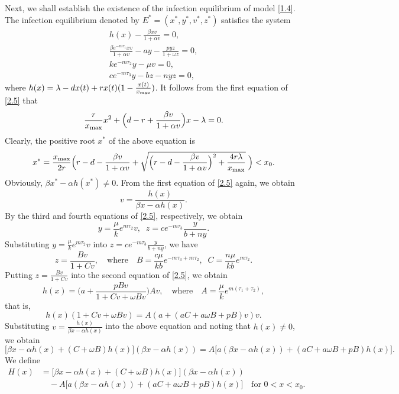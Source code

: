 \documentclass[reqno]{amsart}
\begin{document}
Next, we shall establish the existence of  the infection equilibrium of model 
\eqref{1.4}. The infection equilibrium denoted by $E^{*}=(x^{*},y^{*},v^{*},z^{*})$ 
satisfies the system
 \begin{equation} \label{2.5}
 \begin{gathered}
 h(x)-{\frac{\beta xv}{1+\alpha v}}=0,\\
 {\frac{\beta e^{-m\tau_1}xv}{1+\alpha v}}-ay-{\frac{pyz}{1+\omega z}}=0,\\
 k e^{-m\tau_2}y-\mu v=0,\\
 ce^{-m\tau_3}y-bz-nyz=0,
\end{gathered}
\end{equation}
where $h(x)= \lambda-dx(t)+rx(t)(1-\frac{x(t)}{x_{\rm max}})$.
It follows from  the first equation of \eqref{2.5} that
$$
\frac{r}{x_{\rm max}}x^2+\Big(d-r+\frac{\beta v}{1+\alpha v}\Big)x -\lambda=0.
$$
Clearly, the positive root $x^*$ of the above equation is
$$
x^*=\frac{x_{\rm max}}{2r}
\Big(r-d-\frac{\beta v}{1+\alpha v}+\sqrt{\Big(r-d-\frac{\beta v}{1+\alpha v}
\Big)^{2}+\frac{4r\lambda}{x_{\rm max}}}\;\Big)<x_0.
$$
Obviously, $\beta x^*-\alpha h(x^*)\not=0$.  From the first equation
of \eqref{2.5} again, we obtain
\[
v=\frac{h(x)}{\beta x-\alpha h(x)}.
\]
By the third and fourth equations of  \eqref{2.5}, respectively,  we obtain
$$
y=\frac{\mu }{k}e^{m\tau_2}v, \;\;z=ce^{-m \tau_3}\frac{y}{b+ny}.
$$
Substituting $y=\frac{\mu}{k}e^{m\tau_2}v$ into $z=ce^{-m \tau_3}\frac{y}{b+ny}$,
we have
\[
z=\frac{Bv}{1+Cv}, \quad \text{where}\quad B=\frac{c\mu}{kb}
e^{-m\tau_3+m\tau_2},\;\; C=\frac{n \mu}{kb} e^{m\tau_2}.
\]
Putting $z=\frac{Bv}{1+Cv}$ into the second equation of \eqref{2.5}, we obtain
\[
h(x)=\Big(a+\frac{pBv}{1+Cv+ \omega Bv}\Big)Av, \quad \text{where}\quad
A=\frac{\mu}{k}e^{m(\tau_1+\tau_2)},
\]
that is,
\[
h(x)(1+Cv+\omega Bv)=A(a+(aC+a\omega B+pB)v)v.
\]
Substituting $v=\frac{h(x)}{\beta x-\alpha h(x)}$ into the above equation
and noting that $h(x)\not=0$, we obtain
\[
\Big[\beta x-\alpha h(x)+(C+\omega B)h(x)\Big]
(\beta x-\alpha h(x))=A\Big[a(\beta x-\alpha h(x))+(aC+a\omega B+pB)h(x)\Big].
\]
We define
\begin{equation} \label{2.6}
\begin{aligned}
H(x)&=  \Big[\beta x-\alpha h(x)+(C+\omega B)h(x)\Big](\beta x-\alpha h(x))    \\
&\quad -A\Big[a(\beta x-\alpha h(x))+(aC+a\omega B+pB)h(x)\Big]\quad
 \text{for } 0<x<x_0.
\end{aligned}
\end{equation}
\end{document}
